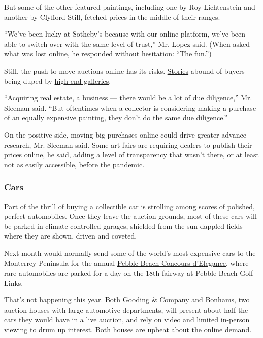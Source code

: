 But some of the other featured paintings, including one by Roy
Lichtenstein and another by Clyfford Still, fetched prices in the middle
of their ranges.

``We've been lucky at Sotheby's because with our online platform, we've
been able to switch over with the same level of trust,'' Mr. Lopez said.
(When asked what was lost online, he responded without hesitation: ``The
fun.'')

Still, the push to move auctions online has its risks.
\href{https://www.nytimes3xbfgragh.onion/2018/05/04/arts/design/art-dealer-pleads-guilty-fraud-case.html?searchResultPosition=1}{Stories}
abound of buyers being duped by
\href{https://www.nytimes3xbfgragh.onion/2017/04/12/arts/design/lawsuit-related-to-art-fraud-scandal-knoedler-is-settled.html?searchResultPosition=3}{high-end
galleries}.

``Acquiring real estate, a business --- there would be a lot of due
diligence,'' Mr. Sleeman said. ``But oftentimes when a collector is
considering making a purchase of an equally expensive painting, they
don't do the same due diligence.''

On the positive side, moving big purchases online could drive greater
advance research, Mr. Sleeman said. Some art fairs are requiring dealers
to publish their prices online, he said, adding a level of transparency
that wasn't there, or at least not as easily accessible, before the
pandemic.

\hypertarget{cars}{%
\subsubsection{Cars}\label{cars}}

Part of the thrill of buying a collectible car is strolling among scores
of polished, perfect automobiles. Once they leave the auction grounds,
most of these cars will be parked in climate-controlled garages,
shielded from the sun-dappled fields where they are shown, driven and
coveted.

Next month would normally send some of the world's most expensive cars
to the Monterrey Peninsula for the annual
\href{https://pebblebeachconcours.net/}{Pebble Beach Concours
d'Elegance}, where rare automobiles are parked for a day on the 18th
fairway at Pebble Beach Golf Links.

That's not happening this year. Both Gooding \& Company and Bonhams, two
auction houses with large automotive departments, will present about
half the cars they would have in a live auction, and rely on video and
limited in-person viewing to drum up interest. Both houses are upbeat
about the online demand.

